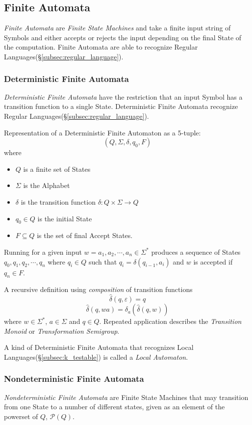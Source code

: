 \documentclass{article}
\begin{document}
\subsection{Finite Automata}
\emph{Finite Automata} are \emph{Finite State Machines} and take a
finite input string of Symbols and either accepts or rejects the
input depending on the final State of the computation. Finite
Automata are able to recognize Regular Languages(\S\ref{subsec:regular_language}).

\subsubsection{Deterministic Finite Automata}\label{subsec:dfa}
\emph{Deterministic Finite Automata} have the restriction that an
input Symbol has a transition function to a single State.
Deterministic Finite Automata recognize Regular
Languages(\S\ref{subsec:regular_language}).

Representation of a Deterministic Finite Automaton as a 5-tuple:
\[
    (Q,\Sigma,\delta,q_0,F)
\]
where
\begin{itemize}
\item $Q$ is a finite set of States
\item $\Sigma$ is the Alphabet
\item $\delta$ is the transition function $\delta: Q \times
  \Sigma \rightarrow Q$
\item $q_0 \in Q$ is the initial State
\item $F \subseteq Q$ is the set of final Accept States.
\end{itemize}

Running for a given input $w = a_1,a_2, \cdots , a_n \in \Sigma^*$
produces a sequence of States $q_0,q_1,q_2,\cdots , q_n$ where $q_i
\in Q$ such that $q_i = \delta (q_{i-1},a_i)$ and $w$ is accepted if
$q_n \in F$.

A recursive definition using \emph{composition} of transition
functions
\[
    \widehat{\delta}(q,\varepsilon) = q
\]\[
    \widehat{\delta}(q,wa) = \delta_a(\widehat{\delta}(q,w))
\]
where $w \in \Sigma^*$, $a \in \Sigma$ and $q \in Q$. Repeated
application describes the \emph{Transition Monoid} or
\emph{Transformation Semigroup}.

A kind of Deterministic Finite Automata that recognizes Local
Languages(\S\ref{subsec:k_testable}) is called a \emph{Local Automaton}.

\subsubsection{Nondeterministic Finite Automata}\label{subsec:ndfa}
\emph{Nondeterministic Finite Automata} are Finite State Machines that
may transition from one State to a number of different states, given
as an element of the powerset of $Q$, $\mathcal{P}(Q)$.
\end{document}
